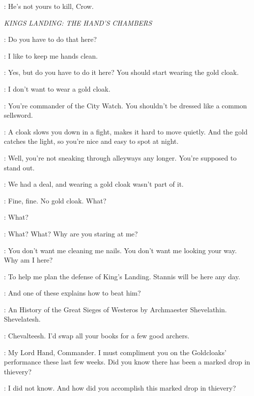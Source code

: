 \LORDOFBONES: He's not yours to kill, Crow. 


\scene

\textit{KINGS LANDING: THE HAND'S CHAMBERS} 


\TYRION: Do you have to do that here? 

\BRONN: I like to keep me hands clean. 

\TYRION: Yes, but do you have to do it here? You should start wearing the gold cloak. 

\BRONN: I don't want to wear a gold cloak. 

\TYRION: You're commander of the City Watch. You shouldn't be dressed like a common sellsword. 

\BRONN: A cloak slows you down in a fight, makes it hard to move quietly. And the gold catches the light, so you're nice and easy to spot at night. 

\TYRION: Well, you're not sneaking through alleyways any longer. You're supposed to stand out. 

\BRONN: We had a deal, and wearing a gold cloak wasn't part of it.


\TYRION: Fine, fine. No gold cloak. What? 

\BRONN: What? 

\TYRION: What? What? Why are you staring at me? 

\BRONN: You don't want me cleaning me nails. You don't want me looking your way. Why am I here? 

\TYRION: To help me plan the defense of King's Landing. Stannis will be here any day. 

\BRONN: And one of these  explains how to beat him? 

\TYRION: An History of the Great Sieges of Westeros by Archmaester Shevelathin. Shevelatesh. 

\BRONN: Chevalteesh. I'd swap all your books for a few good archers.


\VARYS: My Lord Hand, Commander. I must compliment you on the Goldcloaks' performance these last few weeks. Did you know there has been a marked drop in thievery? 

\TYRION: I did not know. And how did you accomplish this marked drop in thievery? 

